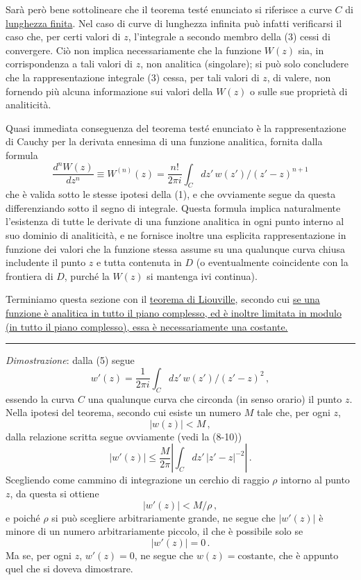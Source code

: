 \documentclass[11pt, a4paper]{book}
\numberwithin{equation}{section}
\begin{document}
Sarà però bene sottolineare che il teorema testé enunciato si riferisce a curve $C$ di \uline{lunghezza finita}. Nel caso di curve di lunghezza infinita può infatti verificarsi il caso che, per certi valori di $z$, l'integrale a secondo membro della (3) cessi di convergere. Ciò non implica necessariamente che la funzione $W(z)$ sia, in corrispondenza a tali valori di $z$, non analitica (singolare); si può solo concludere che la rappresentazione integrale (3) cessa, per tali valori di $z$, di valere, non fornendo più alcuna informazione sui valori della $W(z)$ o sulle sue proprietà di analiticità.

Quasi immediata conseguenza del teorema testé enunciato è la rappresentazione di Cauchy per la derivata ennesima di una funzione analitica, fornita dalla formula
\begin{equation}
\frac{d^n W(z)}{dz^n} \equiv W^{(n)}(z) = \frac{n!}{2\pi i} \int_C dz'\, w(z') / (z'-z)^{n+1} \tag{5}
\end{equation}
che è valida sotto le stesse ipotesi della (1), e che ovviamente segue da questa differenziando sotto il segno di integrale. Questa formula implica naturalmente l'esistenza di tutte le derivate di una funzione analitica in ogni punto interno al suo dominio di analiticità, e ne fornisce inoltre una esplicita rappresentazione in funzione dei valori che la funzione stessa assume su una qualunque curva chiusa includente il punto $z$ e tutta contenuta in $D$ (o eventualmente coincidente con la frontiera di $D$, purché la $W(z)$ si mantenga ivi continua).

Terminiamo questa sezione con il \uline{teorema di Liouville}, secondo cui \uline{se una funzione è analitica in tutto il piano complesso, ed è inoltre limitata in modulo (in tutto il piano complesso), essa è necessariamente una costante.}

\medskip\hrule\medskip

\textit{Dimostrazione}: dalla (5) segue
\[
w'(z) = \frac{1}{2\pi i} \int_C dz'\, w(z') / (z'-z)^2\,,
\]
essendo la curva $C$ una qualunque curva che circonda (in senso orario) il punto $z$. Nella ipotesi del teorema, secondo cui esiste un numero $M$ tale che, per ogni $z$,
\[
|w(z)| < M\,,
\]
dalla relazione scritta segue ovviamente (vedi la (8-10))
\[
|w'(z)| \leq \frac{M}{2\pi} \left| \int_C dz'\, |z'-z|^{-2} \right|\,.
\]
Scegliendo come cammino di integrazione un cerchio di raggio $\rho$ intorno al punto $z$, da questa si ottiene
\[
|w'(z)| < M/\rho\,,
\]
e poiché $\rho$ si può scegliere arbitrariamente grande, ne segue che $|w'(z)|$ è minore di un numero arbitrariamente piccolo, il che è possibile solo se
\[
|w'(z)| = 0\,.
\]
Ma se, per ogni $z$, $w'(z) = 0$, ne segue che $w(z) = \text{costante}$, che è appunto quel che si doveva dimostrare.
\end{document}
